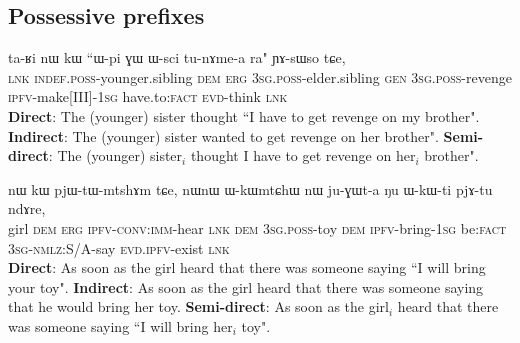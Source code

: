 \documentclass[oneside,a4paper,11pt]{article}
\newcommand{\ipa}[1]{{\phon #1}} %
\begin{document}
 
    
   \subsection{Possessive prefixes}
\begin{exe}
\ex
\gll  \ipa{tɕe}  	\ipa{ta-ʁi}  	\ipa{nɯ}  	\ipa{kɯ}  	``{\ipa{ɯ-pi}}  	\ipa{ɣɯ}  	\ipa{ɯ-sci}  	{\ipa{tu-nɤme-a}}  	\ipa{ra}" 	\ipa{ɲɤ-sɯso}  	\ipa{tɕe,}  	\\
\textsc{lnk}  \textsc{indef.poss}-younger.sibling \textsc{dem} \textsc{erg}  {\textsc{3sg.poss}-elder.sibling}  \textsc{gen} \textsc{3sg.poss}-revenge {\textsc{ipfv}-make[III]-\textsc{1sg}} have.to:\textsc{fact} \textsc{evd}-think \textsc{lnk} \\
\glt  \textbf{Direct}: The (younger) sister thought ``{I have to get revenge} on {my brother}".
\glt  \textbf{Indirect}:  The (younger) sister wanted to get revenge on {her brother}".
\glt  \textbf{Semi-direct}:  The (younger) sister$_i$ thought {I have to get revenge} on {her$_i$ brother}".
  \end{exe}
  
 
\begin{exe}
\ex
\gll   \ipa{tɤɕime}  	\ipa{nɯ}  	\ipa{kɯ}  	\ipa{pjɯ-tɯ-mtshɤm}  	\ipa{tɕe,}  	\ipa{nɯnɯ}  {\ipa{ɯ-kɯmtɕhɯ}}  	\ipa{nɯ}  	{\ipa{ju-ɣɯt-a}}  	\ipa{ŋu}  		\ipa{ɯ-kɯ-ti}  	\ipa{pjɤ-tu}  	\ipa{ndɤre,}  \\
girl \textsc{dem} \textsc{erg} \textsc{ipfv-conv:imm}-hear \textsc{lnk} \textsc{dem} {\textsc{3sg.poss}-toy} \textsc{dem} {\textsc{ipfv}-bring-\textsc{1sg}}  be:\textsc{fact} \textsc{3sg-nmlz}:S/A-say \textsc{evd.ipfv}-exist \textsc{lnk} \\
\glt   \textbf{Direct}: As soon as the girl heard that there was someone saying ``{I will bring} {your toy}".
\glt   \textbf{Indirect}:  As soon as the girl heard that there was someone saying that he would bring {her toy}.
\glt   \textbf{Semi-direct}: As soon as the girl$_i$ heard that there was someone saying ``{I will bring} {her$_i$ toy}".

  \end{exe}
  

 
%       
%   



\end{document}
